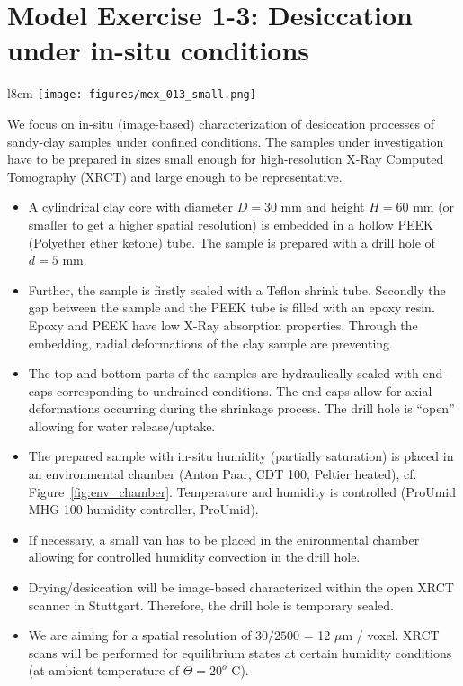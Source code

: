\section[MEX 1-3: Desiccation under in-situ conditions]{Model Exercise 1-3: Desiccation under in-situ conditions}
\label{sec:mex12}
\begin{wrapfigure}{l}{8cm}
\centering
\texttt{[image: figures/mex\_013\_small.png]}
\caption{Anton Paar MCR~502 TwinDrive DMTA-rheometer with ProUmid MHG~100 humidity controller.}
\label{fig:env_chamber}
\end{wrapfigure}

We focus on in-situ (image-based) characterization of desiccation processes of sandy-clay samples under confined conditions. The samples under investigation
have to be prepared in sizes small enough for high-resolution X-Ray Computed Tomography (XRCT) and large enough to be representative.

\begin{itemize}
\item A cylindrical clay core with diameter $D=30$ mm and height 
$H=60$ mm (or smaller to get a higher spatial resolution) is embedded in a hollow PEEK (Polyether ether ketone) tube. 
The sample is prepared with a drill hole of $d=5$ mm.
\item Further, the sample is firstly sealed with a Teflon shrink tube. Secondly the gap between the sample and the PEEK tube is filled with an epoxy resin.
Epoxy and PEEK have low X-Ray absorption properties. Through the embedding, radial deformations of the clay sample are preventing. 
\item The top and bottom parts of the samples are hydraulically sealed with end-caps corresponding to undrained conditions. The end-caps allow for axial deformations occurring during the shrinkage process. The drill hole is ``open''  allowing for water release/uptake.
\item The prepared sample with in-situ humidity (partially saturation) is placed in an environmental chamber (Anton Paar, CDT 100, Peltier heated), cf. Figure~\ref{fig:env_chamber}. Temperature and humidity is controlled (ProUmid MHG 100 humidity controller, ProUmid). 
\item If necessary, a small van has to be placed in the enironmental chamber allowing for controlled humidity convection in the drill hole. 
\item Drying/desiccation will be image-based characterized within the open XRCT scanner in Stuttgart. Therefore, the drill hole is temporary sealed.
\item We are aiming for a spatial resolution of $30 / 2500$ = 12 $\mu$m / voxel. XRCT scans will be performed for equilibrium states at certain humidity conditions (at ambient temperature of $\Theta = 20^o$ C).
\end{itemize}
